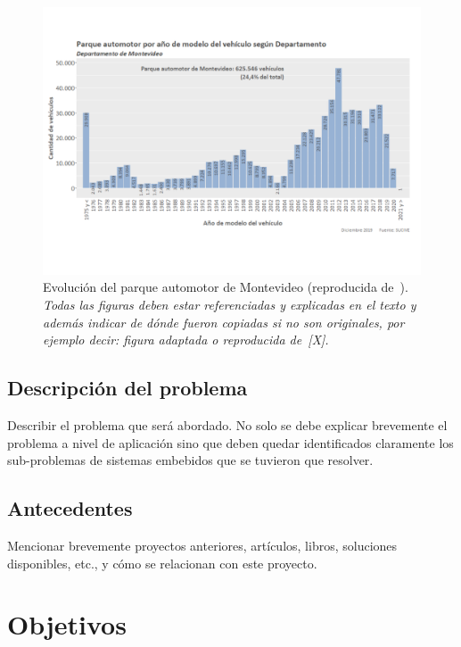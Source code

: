 \documentclass[a4paper,12pt]{article}
\begin{document}
\begin{linenumbers}
\begin{figure}[ht]
  \begin{center}
    \includegraphics[width=1\textwidth]{autos.pdf}
  \end{center}
  \caption{Evolución del parque automotor de Montevideo (reproducida de~\cite{mtop2020}). \textit{Todas las figuras deben estar referenciadas y explicadas en el texto y adem\'as indicar de dónde fueron copiadas si no son originales, por ejemplo decir: figura adaptada o reproducida de~[X].}}
  \label{fig:autos}
\end{figure}


\subsection{Descripci\'on del problema}
\label{sec:problema}

Describir el problema que será abordado. No solo se debe explicar brevemente el problema a nivel de aplicaci\'on sino que deben quedar identificados claramente los sub-problemas de sistemas embebidos que se tuvieron que resolver. 

\subsection{Antecedentes} 
\label{sec:antencedentes}

Mencionar brevemente proyectos anteriores, art\'iculos, libros, soluciones disponibles, etc., y cómo se relacionan con este proyecto.  

\section{Objetivos}
\label{sec:objetivos}


\end{linenumbers}
\end{document}
